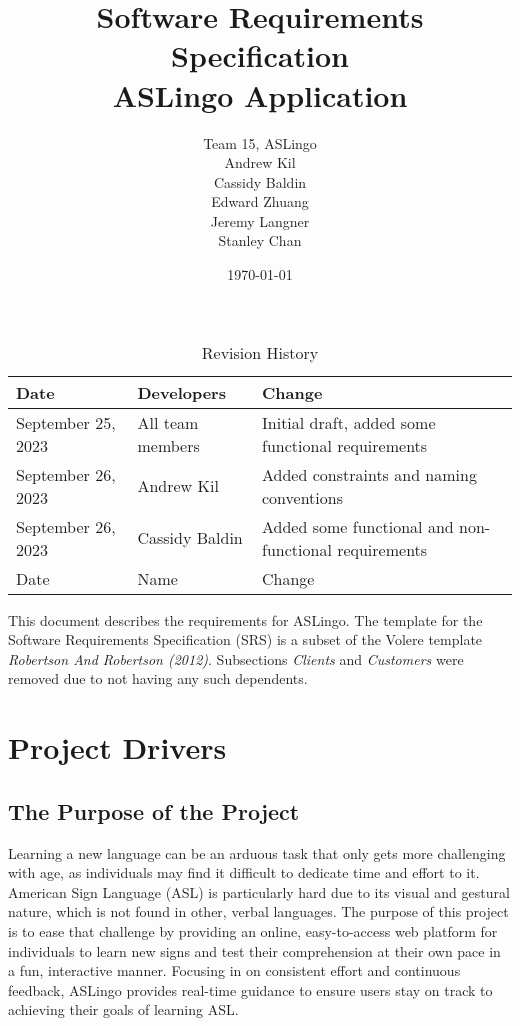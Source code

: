 \documentclass[12pt, titlepage]{article}
\title{Software Requirements Specification\\ASLingo Application}
\author{Team 15, ASLingo
		\\ Andrew Kil
		\\ Cassidy Baldin
		\\ Edward Zhuang
		\\ Jeremy Langner
		\\ Stanley Chan
}
\date{\today}
\begin{document}
\maketitle

\tableofcontents
\listoftables
\listoffigures

\begin{table}[bp]
\caption{Revision History}
\begin{tabularx}{\textwidth}{|l|l|X|}
\toprule {\bf Date} & {\bf Developers} & {\bf Change}\\
\midrule
September 25, 2023 & All team members & Initial draft, added some functional requirements \\
September 26, 2023 & Andrew Kil & Added constraints and naming conventions \\
September 26, 2023 & Cassidy Baldin & Added some functional and non-functional requirements\\
Date & Name & Change\\
\bottomrule
\end{tabularx}
\end{table}

\newpage


This document describes the requirements for ASLingo. The template for the Software
Requirements Specification (SRS) is a subset of the Volere
template \textit{Robertson And Robertson (2012)}.  Subsections \textit{Clients} and \textit{Customers} were removed due to not having any such dependents.

\section{Project Drivers}

\subsection{The Purpose of the Project}

Learning a new language can be an arduous task that only gets more challenging
with age, as individuals may find it difficult to dedicate time and effort to
it. American Sign Language (ASL) is particularly hard due to its visual and
gestural nature, which is not found in other, verbal languages. The purpose of this project is
to ease that challenge by providing an online, easy-to-access web platform for
individuals to learn new signs and test their comprehension at their own pace
in a fun, interactive manner. Focusing in on consistent effort and continuous
feedback, ASLingo provides real-time guidance to ensure users stay on track to
achieving their goals of learning ASL.
\end{document}
